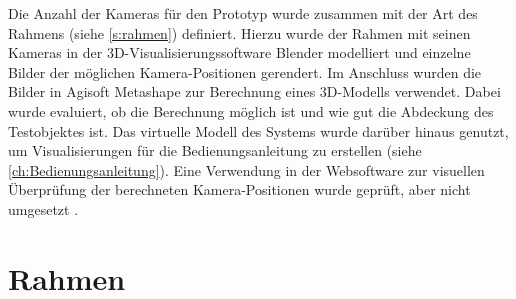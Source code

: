 \documentclass[./00PhotoBox.tex]{subfiles}
\begin{document}
Die Anzahl der Kameras für den Prototyp wurde zusammen mit der Art des Rahmens (siehe \autoref{s:rahmen}) definiert. Hierzu wurde der Rahmen mit seinen Kameras in der 3D-Visualisierungssoftware Blender modelliert und einzelne Bilder der möglichen Kamera-Positionen gerendert. Im Anschluss wurden die Bilder in Agisoft Metashape zur Berechnung eines 3D-Modells verwendet. Dabei wurde evaluiert, ob die Berechnung möglich ist und wie gut die Abdeckung des Testobjektes ist. Das virtuelle Modell des Systems wurde darüber hinaus genutzt, um Visualisierungen für die Bedienungsanleitung zu erstellen (siehe \autoref{ch:Bedienungsanleitung}). Eine Verwendung in der Websoftware zur visuellen Überprüfung der berechneten Kamera-Positionen wurde geprüft, aber nicht umgesetzt .

\section{Rahmen}
\label{s:rahmen}
\end{document}
